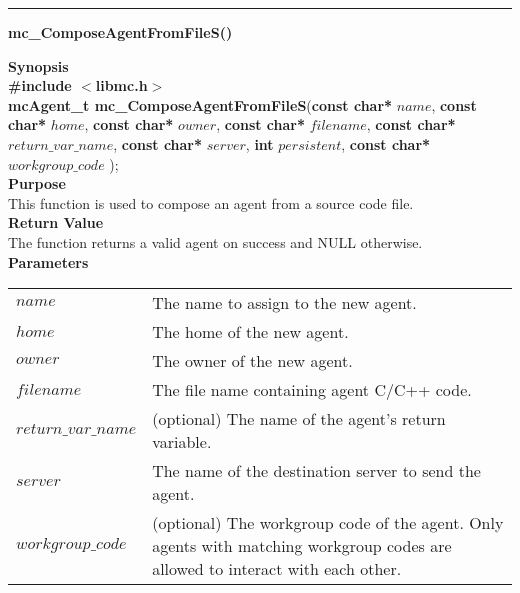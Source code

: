 \noindent
\vspace{5pt}
\rule{6.5in}{0.015in}
\noindent
{}
{\LARGE \bf mc\_ComposeAgentFromFileS()}\\

\noindent
{\bf Synopsis}\\
{\bf \#include $<$libmc.h$>$}\\
{\bf mcAgent\_t mc\_ComposeAgentFromFileS}({\bf const char*} $name$, 
                                  {\bf const char*} $home$,
                                  {\bf const char*} $owner$,
                                  {\bf const char*} $filename$,
                                  {\bf const char*} $return\_var\_name$,
                                  {\bf const char*} $server$,
                                  {\bf int} $persistent$,
                                  {\bf const char*} $workgroup\_code$
																	);\\

\noindent
{\bf Purpose}\\
This function is used to compose an agent from a source code file.\\

\noindent
{\bf Return Value}\\
The function returns a valid agent on success and NULL otherwise.\\

\noindent
{\bf Parameters}
\vspace{-0.1in}
\begin{description}
\item
\begin{tabular}{p{30 mm}p{125 mm}} 
$name$ & The name to assign to the new agent.\\
$home$ & The home of the new agent.\\
$owner$ & The owner of the new agent.\\
$filename$ & The file name containing agent C/C++ code.\\
$return\_var\_name$ & (optional) The name of the agent's return variable.\\
$server$ & The name of the destination server to send the agent.\\
$workgroup\_code$ & (optional) The workgroup code of the agent. Only agents with matching workgroup codes are allowed to interact with each other.\\
\end{tabular}
\end{description}

